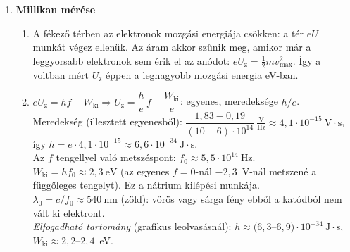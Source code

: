 \documentclass[11pt,a4paper]{article}
\begin{document}
\begin{enumerate}
\item \textbf{Millikan mérése}
  \begin{enumerate}
    \item A fékező térben az elektronok mozgási energiája csökken: a tér $eU$ munkát
      végez ellenük. Az áram akkor szűnik meg, amikor már a leggyorsabb elektronok sem
      érik el az anódot: $eU_\text{z} = \tfrac12 m v_\text{max}^2$. Így a voltban mért
      $U_\text{z}$ éppen a legnagyobb mozgási energia eV-ban.
    \item
      \begin{minipage}[t]{0.55\linewidth}\raggedright
      $eU_\text{z} = hf - W_\text{ki} \Rightarrow U_\text{z} = \dfrac{h}{e}\,f -
      \dfrac{W_\text{ki}}{e}$: egyenes, meredeksége $h/e$.\\[3pt]
      Meredekség (illesztett egyenesből):
      $\dfrac{1{,}83 - 0{,}19}{(10-6)\cdot 10^{14}}~\tfrac{\text{V}}{\text{Hz}}
      \approx 4{,}1\cdot 10^{-15}~\text{V}\cdot\text{s}$, így
      $h = e\cdot 4{,}1\cdot 10^{-15} \approx 6{,}6\cdot 10^{-34}~\text{J}\cdot\text{s}$.\\[3pt]
      Az $f$ tengellyel való metszéspont: $f_0 \approx 5{,}5\cdot 10^{14}~\text{Hz}$.\\
      $W_\text{ki} = hf_0 \approx 2{,}3~\text{eV}$ (az egyenes $f = 0$-nál $-2{,}3$~V-nál
      metszené a függőleges tengelyt). Ez a nátrium kilépési munkája.\\
      $\lambda_0 = c/f_0 \approx 540~\text{nm}$ (zöld): vörös vagy sárga fény ebből a
      katódból nem vált ki elektront.\\[3pt]
      \emph{Elfogadható tartomány} (grafikus leolvasásnál):
      $h \approx (6{,}3$--$6{,}9)\cdot 10^{-34}~\text{J}\cdot\text{s}$,
      $W_\text{ki} \approx 2{,}2$--$2{,}4$~eV.
      \end{minipage}\hfill
      \begin{minipage}[t]{0.42\linewidth}\vspace{0pt}\centering
\end{minipage}
\end{enumerate}
\end{enumerate}
\end{document}
